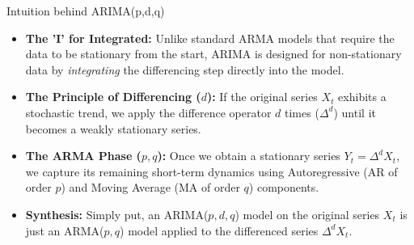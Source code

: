 \documentclass[aspectratio=169]{beamer}
\begin{document}
\begin{frame}{Intuition behind ARIMA(p,d,q)}
\begin{itemize}
    \item \textbf{The 'I' for Integrated:} Unlike standard ARMA models that require the data to be stationary from the start, ARIMA is designed for non-stationary data by \textit{integrating} the differencing step directly into the model.
    
    \vspace{0.2cm}
    
    \item \textbf{The Principle of Differencing ($d$):} If the original series $X_t$ exhibits a stochastic trend, we apply the difference operator $d$ times ($\Delta^d$) until it becomes a weakly stationary series.
    
    \vspace{0.2cm}
    
    \item \textbf{The ARMA Phase ($p, q$):} Once we obtain a stationary series $Y_t = \Delta^d X_t$, we capture its remaining short-term dynamics using Autoregressive (AR of order $p$) and Moving Average (MA of order $q$) components.
    
    \vspace{0.2cm}
    
    \item \textbf{Synthesis:} Simply put, an ARIMA($p, d, q$) model on the original series $X_t$ is just an ARMA($p, q$) model applied to the differenced series $\Delta^d X_t$.
\end{itemize}
\end{frame}
\end{document}
